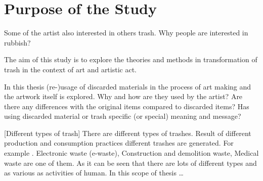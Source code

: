 %
\section{Purpose of the Study}

Some of the artist also interested in others trash. Why people are interested in rubbish?


The aim of this study is to explore the theories and methods in transformation of trash in the context of art and artistic act.

In this thesis (re-)usage of discarded materials in the process of art making and the artwork itself is explored. Why and how are they used by the artist? Are there any differences with the original items compared to discarded items? Has using discarded material or trash specific (or special) meaning and message? 






%
%
[Different types of trash] There are different types of trashes. Result of different production and consumption practices different trashes are generated. For example . Electronic waste (e-waste), Construction and demolition waste, Medical waste are one of them. As it can be seen that there are lots of different types and as various as activities of human. In this scope of thesis \ldots {}





